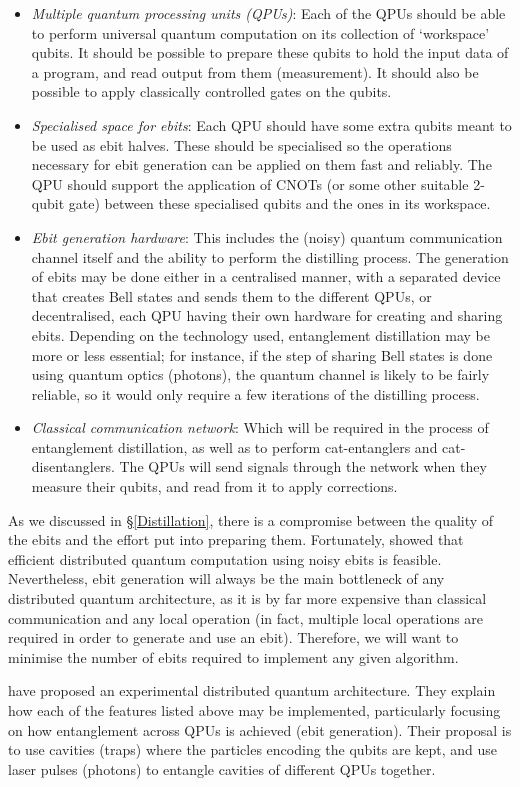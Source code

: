 \begin{itemize}
  \item \textit{Multiple quantum processing units (QPUs)}: Each of the QPUs should be able to perform universal quantum computation on its collection of `workspace' qubits. It should be possible to prepare these qubits to hold the input data of a program, and read output from them (measurement). It should also be possible to apply classically controlled gates on the qubits.

  \item \textit{Specialised space for ebits}: Each QPU should have some extra qubits meant to be used as ebit halves. These should be specialised so the operations necessary for ebit generation can be applied on them fast and reliably. The QPU should support the application of CNOTs (or some other suitable 2-qubit gate) between these specialised qubits and the ones in its workspace.
  
  \item \textit{Ebit generation hardware}: This includes the (noisy) quantum communication channel itself and the ability to perform the distilling process. The generation of ebits may be done either in a centralised manner, with a separated device that creates Bell states and sends them to the different QPUs, or decentralised, each QPU having their own hardware for creating and sharing ebits. Depending on the technology used, entanglement distillation may be more or less essential; for instance, if the step of sharing Bell states is done using quantum optics (photons), the quantum channel is likely to be fairly reliable, so it would only require a few iterations of the distilling process.
  
  \item \textit{Classical communication network}: Which will be required in the process of entanglement distillation, as well as to perform cat-entanglers and cat-disentanglers. The QPUs will send signals through the network when they measure their qubits, and read from it to apply corrections. 
\end{itemize}

As we discussed in \S\ref{Distillation}, there is a compromise between the quality of the ebits and the effort put into preparing them. Fortunately, \citet{NoisyChannels} showed that efficient distributed quantum computation using noisy ebits is feasible. Nevertheless, ebit generation will always be the main bottleneck of any distributed quantum architecture, as it is by far more expensive than classical communication and any local operation (in fact, multiple local operations are required in order to generate and use an ebit). Therefore, we will want to minimise the number of ebits required to implement any given algorithm.

\citet{DistributedQCHW} have proposed an experimental distributed quantum architecture. They explain how each of the features listed above may be implemented, particularly focusing on how entanglement across QPUs is achieved (ebit generation). Their proposal is to use cavities (traps) where the particles encoding the qubits are kept, and use laser pulses (photons) to entangle cavities of different QPUs together.